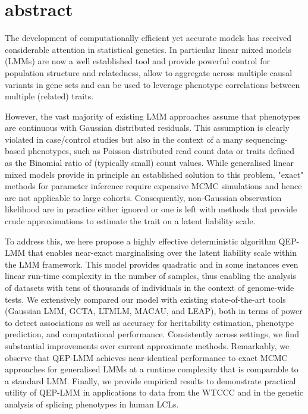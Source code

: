 \section{abstract}

The development of computationally efficient yet accurate models has received
considerable attention in statistical genetics. In particular linear mixed
models (LMMs) are now a well established tool and provide powerful control for
population structure and relatedness, allow to aggregate across multiple causal
variants in gene sets and can be used to leverage phenotype correlations between
multiple (related) traits.

However, the vast majority of existing LMM approaches assume that phenotypes
are continuous with Gaussian distributed residuals. This assumption is clearly
violated in case/control studies but also in the context of a many
sequencing-based phenotypes, such as Poisson distributed read count data or
traits defined as the Binomial ratio of (typically small) count values. While
generalised linear mixed models provide in principle an established solution to
this problem, "exact" methods for parameter inference require expensive MCMC
simulations and hence are not applicable to large cohorts. Consequently,
non-Gaussian observation likelihood are in practice either ignored or one is
left with methods that provide crude approximations to estimate the trait on a
latent liability scale.

To address this, we here propose a highly effective deterministic algorithm
QEP-LMM that enables near-exact marginalising over the latent liability scale
within the LMM framework. This model provides quadratic and in some instances
even linear run-time complexity in the number of samples, thus enabling the
analysis of datasets with tens of thousands of individuals in the context of
genome-wide tests. We extensively compared our model with existing
state-of-the-art tools (Gaussian LMM, GCTA, LTMLM, MACAU, and LEAP), both in
terms of power to detect associations as well as accuracy for heritability
estimation, phenotype prediction, and computational performance. Consistently
across settings, we find substantial improvements over current approximate
methods. Remarkably, we observe that QEP-LMM achieves near-identical performance
to exact MCMC approaches for generalised LMMs at a runtime complexity that is
comparable to a standard LMM. Finally, we provide empirical results to
demonstrate practical utility of QEP-LMM in applications to data from the WTCCC
and in the genetic analysis of splicing phenotypes in human LCLs.
